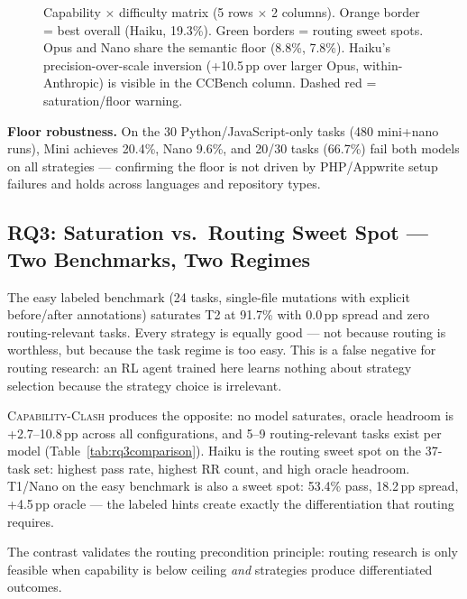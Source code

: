 \documentclass[sigconf,review,anonymous]{acmart}
\newcommand{\ccbench}{\textsc{Capability-Clash}}
\newcommand{\pp}{\,pp}
\begin{document}
\begin{figure}[t]
{\begin{tikzpicture}[font=\small, x=1mm, y=1mm]
\end{tikzpicture}}
\caption{Capability $\times$ difficulty matrix (5 rows $\times$ 2 columns). Orange border = best overall (Haiku, 19.3\%). Green borders = routing sweet spots. Opus and Nano share the semantic floor (8.8\%, 7.8\%). Haiku's precision-over-scale inversion (+10.5\pp{} over larger Opus, within-Anthropic) is visible in the CCBench column. Dashed red = saturation/floor warning.}
\label{fig:ccmatrix}
\end{figure}

\textbf{Floor robustness.} On the 30 Python/JavaScript-only tasks (480 mini+nano runs), Mini achieves 20.4\%, Nano 9.6\%, and 20/30 tasks (66.7\%) fail both models on all strategies — confirming the floor is not driven by PHP/Appwrite setup failures and holds across languages and repository types.

\subsection{RQ3: Saturation vs.\ Routing Sweet Spot — Two Benchmarks, Two Regimes}
\label{sec:rq3}

The easy labeled benchmark (24 tasks, single-file mutations with explicit before/after annotations) saturates T2 at 91.7\% with 0.0\pp{} spread and zero routing-relevant tasks. Every strategy is equally good — not because routing is worthless, but because the task regime is too easy. This is a false negative for routing research: an RL agent trained here learns nothing about strategy selection because the strategy choice is irrelevant.

\ccbench{} produces the opposite: no model saturates, oracle headroom is +2.7--10.8\pp{} across all configurations, and 5--9 routing-relevant tasks exist per model (Table~\ref{tab:rq3comparison}). Haiku is the routing sweet spot on the 37-task set: highest pass rate, highest RR count, and high oracle headroom. T1/Nano on the easy benchmark is also a sweet spot: 53.4\% pass, 18.2\pp{} spread, +4.5\pp{} oracle — the labeled hints create exactly the differentiation that routing requires.

The contrast validates the routing precondition principle: routing research is only feasible when capability is below ceiling \emph{and} strategies produce differentiated outcomes.
\end{document}
